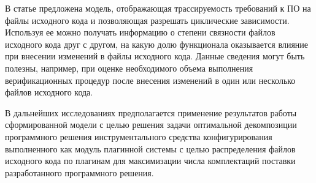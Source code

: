 

В статье предложена модель, отображающая трассируемость требований к ПО на файлы исходного кода и позволяющая разрешать циклические зависимости. Используя ее можно получать информацию о степени связности файлов исходного кода друг с другом, на какую долю функционала оказывается влияние при внесении изменений в файлы исходного кода. Данные сведения могут быть полезны, например, при оценке необходимого объема выполнения верификационных процедур после внесения изменений в один или несколько файлов исходного кода.

В дальнейших исследованиях предполагается применение результатов работы сформированной модели с целью решения задачи оптимальной декомпозиции программного решения инструментального средства конфигурирования выполненного как модуль плагинной системы с целью распределения файлов исходного кода по плагинам для максимизации числа комплектаций поставки разработанного программного решения.